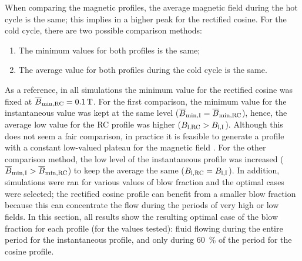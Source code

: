 \documentclass[draft]{svjour3}
\begin{document}
When comparing the magnetic profiles, the average magnetic field during the hot cycle is the same; this implies in a higher peak for the rectified cosine. For the cold cycle, there are two possible comparison methods:

\begin{enumerate}
\item The minimum values for both profiles is the same;
\item The average value for both profiles during the cold cycle is the same.
\end{enumerate}

As a reference, in all simulations  the minimum value for the rectified cosine was fixed at $\overline{B}_{\mathrm{min,RC}} = \SI{0.1}{\tesla}$. For the first comparison, the minimum value for the instantaneous value was kept at the same level ($\overline{B}_{\mathrm{min,I}} =  \overline{B}_{\mathrm{min,RC}}$), hence, the average low value for the RC profile was higher ($B_{\mathrm{l,RC}} > B_{\mathrm{l,I}}$). Although this does not seem a fair comparison, in practice it is feasible to generate a profile with a constant low-valued plateau for the magnetic field \cite{bib:insinga16_optim,bib:benedict16_desig}. For the other comparison method, the low level of the instantaneous profile was increased ($\overline{B}_{\mathrm{min,I}} >  \overline{B}_{\mathrm{min,RC}}$) to keep the average the same ($B_{\mathrm{l,RC}} = B_{\mathrm{l,I}}$). In addition, simulations were ran for various values of blow fraction and the optimal cases were selected; the rectified cosine profile can benefit from a smaller blow fraction because this can concentrate the flow during the periods of very high or low fields. In this section, all results show the resulting optimal case of the blow fraction for each profile (for the values tested): fluid flowing during the entire period for the instantaneous profile, and only during \SI{60}{\percent} of the period for the cosine profile.
\end{document}

